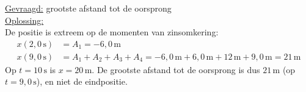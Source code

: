\documentclass{ximera}
\begin{document}
\begin{exercise}
\begin{question}
\begin{solution}
            \underline{Gevraagd:} grootste afstand tot de oorsprong\\

            \underline{Oplossing:}\\
            De positie is extreem op de momenten van zinsomkering:
            \begin{align*}
                x(2{,}0 \, \mathrm{s}) &= A_1 = -6{,}0 \, \mathrm{m}\\
                x(9{,}0 \, \mathrm{s}) &= A_1 + A_2 + A_3 + A_4 = -6{,}0 \, \mathrm{m} + 6{,}0 \, \mathrm{m} + 12 \, \mathrm{m} + 9{,}0 \, \mathrm{m} = \boxed{21 \, \mathrm{m}}
            \end{align*}
            Op $t = 10 \, \mathrm{s}$ is $x = 20 \, \mathrm{m}$. De grootste afstand tot de oorsprong is dus $21 \, \mathrm{m}$ (op $t = 9{,}0 \, \mathrm{s}$), en niet de eindpositie.
        \end{solution}
    \end{question}
\end{exercise}
\end{document}
